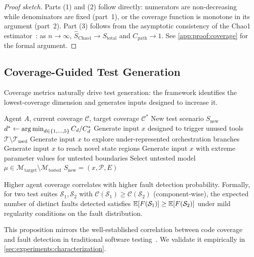\begin{proof}[Proof sketch]
Parts (1) and (2) follow directly: numerators are non-decreasing while
denominators are fixed (part~1), or the coverage function is monotone
in its argument (part~2). Part (3) follows from the asymptotic
consistency of the Chao1 estimator~\citep{chao1984nonparametric}: as
$n \to \infty$, $\hat{S}_{\text{Chao1}} \to S_{\text{total}}$ and
$C_{\text{path}} \to 1$.
See \cref{app:proof:coverage} for the formal argument.
\end{proof}

\subsection{Coverage-Guided Test Generation}
\label{sec:coverage:generation}

Coverage metrics naturally drive test generation: the framework
identifies the lowest-coverage dimension and generates inputs designed to
increase it.

\begin{algorithm}[t]
\caption{Coverage-Guided Test Input Generation}
\label{alg:coverage-gen}
\begin{algorithmic}[1]
\REQUIRE Agent $A$, current coverage $\mathcal{C}$, target coverage $\mathcal{C}^*$
\ENSURE New test scenario $S_{\text{new}}$
\STATE $d^* \gets \operatorname*{arg\,min}_{d \in \{1,\ldots,5\}} C_d / C_d^*$
  \STATE Generate input $x$ designed to trigger unused tools
    $\mathcal{T} \setminus \mathcal{T}_{\text{used}}$
  \STATE Generate input $x$ to explore under-represented orchestration
    branches
  \STATE Generate input $x$ to reach novel state regions
  \STATE Generate input $x$ with extreme parameter values for untested
    boundaries
  \STATE Select untested model $\mu \in \mathcal{M}_{\text{target}}
    \setminus \mathcal{M}_{\text{tested}}$
\ENDIF
\RETURN $S_{\text{new}} = (x, \mathcal{P}, E)$
\end{algorithmic}
\end{algorithm}

\begin{proposition}
\label{prop:coverage-fault}
Higher agent coverage correlates with higher fault detection probability.
Formally, for two test suites $\mathcal{S}_1, \mathcal{S}_2$ with
$\mathcal{C}(\mathcal{S}_1) \geq \mathcal{C}(\mathcal{S}_2)$
(component-wise), the expected number of distinct faults detected
satisfies $\mathbb{E}[F(\mathcal{S}_1)] \geq \mathbb{E}[F(\mathcal{S}_2)]$ under mild
regularity conditions on the fault distribution.
\end{proposition}

This proposition mirrors the well-established correlation between code
coverage and fault detection in traditional software
testing~\citep{zhu1997software}. We validate it empirically in
\cref{sec:experiments:characterization}.
